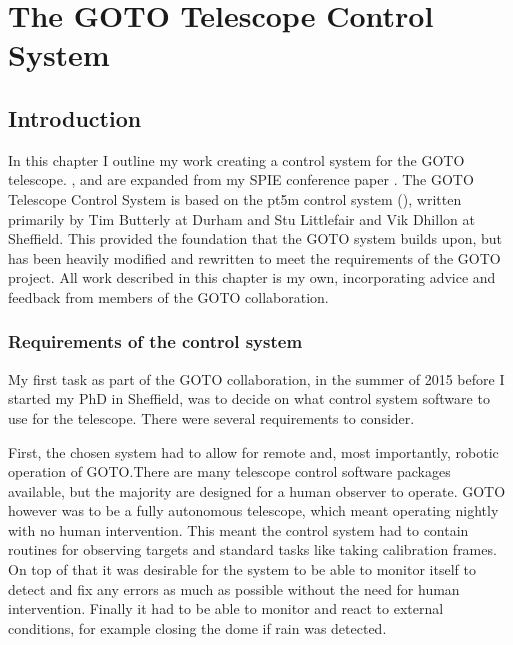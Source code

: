 \chapter{The GOTO Telescope Control System}
\label{chap:gtecs}
\chaptoc{}


\newpage
\section{Introduction}
\label{sec:gtecs_intro}
\begin{colsection}


\begin{colsection}

In this chapter I outline my work creating a control system for the GOTO telescope. ,  and  are expanded from my SPIE conference paper \citealt{Dyer}. The GOTO Telescope Control System is based on the pt5m control system (\citealt{pt5m}), written primarily by Tim Butterly at Durham and Stu Littlefair and Vik Dhillon at Sheffield. This provided the foundation that the GOTO system builds upon, but has been heavily modified and rewritten to meet the requirements of the GOTO project. All work described in this chapter is my own, incorporating advice and feedback from members of the GOTO collaboration.

\end{colsection}


\subsection{Requirements of the control system}
\label{sec:control_requirements}
\begin{colsection}

My first task as part of the GOTO collaboration, in the summer of 2015 before I started my PhD in Sheffield, was to decide on what control system software to use for the telescope. There were several requirements to consider.

First, the chosen system had to allow for remote and, most importantly, robotic operation of GOTO.\@ There are many telescope control software packages available, but the majority are designed for a human observer to operate. GOTO however was to be a fully autonomous telescope, which meant operating nightly with no human intervention. This meant the control system had to contain routines for observing targets and standard tasks like taking calibration frames. On top of that it was desirable for the system to be able to monitor itself to detect and fix any errors as much as possible without the need for human intervention. Finally it had to be able to monitor and react to external conditions, for example closing the dome if rain was detected.


\end{colsection}
\end{colsection}
